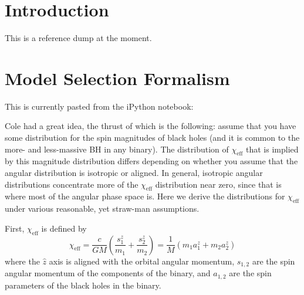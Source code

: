 \documentclass[modern]{aastex61}
\newcommand{\chieff}{\chi_\mathrm{eff}}
\begin{document}
\acresetall{}

\section{Introduction}

This is a reference dump at the moment.  

\section{Model Selection Formalism}
\label{sec:formalism}

This is currently pasted from the iPython notebook:

Cole had a great idea, the thrust of which is the following: assume
that you have some distribution for the spin magnitudes of black holes
(and it is common to the more- and less-massive BH in any binary).
The distribution of $\chieff$ that is implied by this magnitude
distribution differs depending on whether you assume that the angular
distribution is isotropic or aligned.  In general, isotropic angular
distributions concentrate more of the $\chieff$ distribution near
zero, since that is where most of the angular phase space is.  Here we
derive the distributions for $\chieff$ under various reasonable, yet
straw-man assumptions.

First, $\chieff$ is defined by
\begin{equation}
\chieff = \frac{c}{GM} \left( \frac{s_1^z}{m_1} + \frac{s_2^z}{m_2}
\right) = \frac{1}{M} \left( m_1 a_1^z + m_2 a_2^z \right)
\end{equation}
where the $\hat{z}$ axis is aligned with the orbital angular momentum,
$s_{1,2}$ are the spin angular momentum of the components of the
binary, and $a_{1,2}$ are the spin parameters of the black holes in
the binary.
\end{document}
